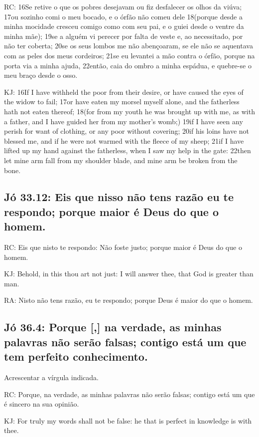 RC: 16Se retive o que os pobres desejavam ou fiz desfalecer os olhos da viúva; 17ou sozinho comi o meu bocado, e o órfão não comeu dele 18(porque desde a minha mocidade cresceu comigo como com seu pai, e o guiei desde o ventre da minha mãe); 19se a alguém vi perecer por falta de veste e, ao necessitado, por não ter coberta; 20se os seus lombos me não abençoaram, se ele não se aquentava com as peles dos meus cordeiros; 21se eu levantei a mão contra o órfão, porque na porta via a minha ajuda, 22então, caia do ombro a minha espádua, e quebre-se o meu braço desde o osso.

KJ: 16If I have withheld the poor from their desire, or have caused the eyes of the widow to fail; 17or have eaten my morsel myself alone, and the fatherless hath not eaten thereof; 18(for from my youth he was brought up with me, as with a father, and I have guided her from my mother's womb;) 19if I have seen any perish for want of clothing, or any poor without covering; 20if his loins have not blessed me, and if he were not warmed with the fleece of my sheep; 21if I have lifted up my hand against the fatherless, when I saw my help in the gate: 22then let mine arm fall from my shoulder blade, and mine arm be broken from the bone.

\subsection{Jó 33.12: Eis que nisso não tens razão\uwave{;} eu te respondo; porque maior é Deus do que o homem.}

RC: Eis que nisto te respondo: Não foste justo; porque maior é Deus do que o homem.

KJ: Behold, in this thou art not just: I will answer thee, that God is greater than man.

RA: Nisto não tens razão, eu te respondo; porque Deus é maior do que o homem.

\subsection{Jó 36.4: Porque [,] na verdade, as minhas palavras não serão falsas; contigo está um que tem perfeito conhecimento.}
Acrescentar a vírgula indicada.

RC: Porque, na verdade, as minhas palavras não serão falsas; contigo está um que é sincero na sua opinião.

KJ: For truly my words shall not be false: he that is perfect in knowledge is with thee.


